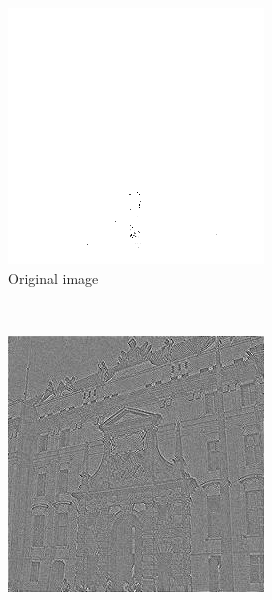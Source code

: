 \documentclass{report}
\begin{document}
\begin{figure}[H]
        \centering
        \begin{subfigure}[b]{0.2\textwidth}
                \includegraphics[width=\textwidth]{graphics/original.png}
                \caption{Original image}
                \label{fig:gull}
        \end{subfigure}%
        ~
        \begin{subfigure}[b]{0.2\textwidth}
                \includegraphics[width=\textwidth]{graphics/flat_power.jpg}

\end{subfigure}
\end{figure}
\end{document}
